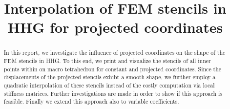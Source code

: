 \documentclass[a4paper,11pt,reqno]{amsart}
\title{Interpolation of FEM stencils in HHG for projected coordinates}
\numberwithin{figure}{section}
\numberwithin{table}{section}
\numberwithin{figure}{subsection}
\begin{document}
\maketitle

\begin{abstract}
In this report, we investigate the influence of projected coordinates on
the shape of the FEM stencils in HHG. To this end, we print and visualize 
the stencils of all inner points within on macro tetrahedron for constant
and projected coordinates. Since the displacements of the projected stencils
exhibt a smooth shape, we further employ a quadratic interpolation of
these stencils instead of the costly computation via local stiffness matrices.
Further investigations are made in order to show if this approach is feasible.
Finally we extend this approach also to variable coefficients.
\end{abstract}\medskip

\end{document}
